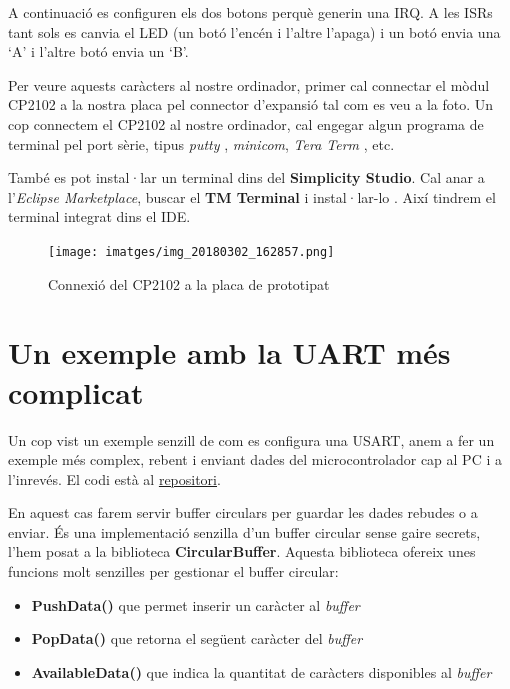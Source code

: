 A continuació es configuren els dos botons perquè generin una \gls{IRQ}. A les \glspl{ISR} tant sols es canvia el LED (un botó l'encén i l'altre l'apaga) i un botó envia una ‘A' i l'altre botó envia un ‘B'.

Per veure aquests caràcters al nostre ordinador, primer cal connectar el mòdul CP2102 a la nostra placa pel connector d'expansió tal com es veu a la foto. Un cop connectem el CP2102 al nostre ordinador, cal engegar algun programa de terminal pel port sèrie, tipus {\em putty} \cite{putty}, {\em minicom}, {\em Tera Term} \cite{teraterm}, etc.

\begin{remark}
 També es pot instal·lar un terminal dins del {\bf Simplicity Studio}. Cal anar a l'{\em Eclipse Marketplace}, buscar el {\bf TM Terminal} i instal·lar-lo \cite{tmterminal}. Així tindrem el terminal integrat dins el IDE.
\end{remark}

\begin{figure}
 \centering
 \texttt{[image: imatges/img\_20180302\_162857.png]}
 \caption{Connexió del CP2102 a la placa de prototipat}
 \label{fig:CP2102}
\end{figure}


\section{Un exemple amb la UART més complicat}
\label{sec:UART_example_2}
Un cop vist un exemple senzill de com es configura una USART, anem a fer un exemple més complex, rebent i enviant dades del microcontrolador cap al PC i a l'inrevés. El codi està al \href{https://github.com/mariusmm/cursembedded/tree/master/Simplicity/UART_2}{repositori}.

En aquest cas farem servir \glspl{buffer circular} per guardar les dades rebudes o a enviar.  És una implementació senzilla d'un buffer circular sense gaire secrets, l'hem posat a la biblioteca {\bf CircularBuffer}. Aquesta biblioteca ofereix unes funcions molt senzilles per gestionar el buffer circular:
\begin{itemize}
 \item {\bf PushData()} que permet inserir un caràcter al {\em buffer}
 \item {\bf PopData()} que retorna el següent caràcter del {\em buffer}
 \item {\bf AvailableData()} que indica la quantitat de caràcters disponibles al {\em buffer}
\end{itemize}

